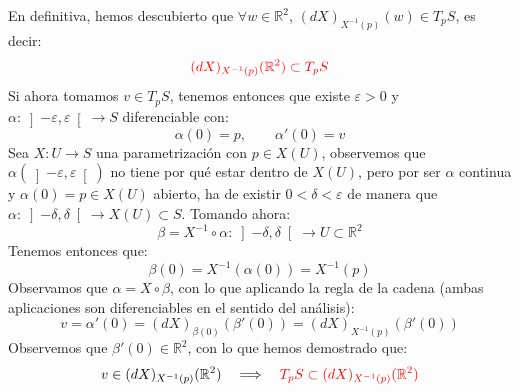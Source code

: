 \noindent
En definitiva, hemos descubierto que $\forall w\in \mathbb{R}^2$, $(dX)_{X^{-1}(p)}(w)\in T_pS$, es decir:
\begin{equation*}
    {\color{red}(dX)_{X^{-1}(p)}(\mathbb{R}^2) \subset T_pS}
\end{equation*}
Si ahora tomamos $v\in T_pS$, tenemos entonces que existe $\varepsilon>0$ y $\alpha:\left]-\varepsilon,\varepsilon\right[\to S$ diferenciable con:
\begin{equation*}
    \alpha(0) = p, \qquad \alpha'(0) = v
\end{equation*}
Sea $X:U\to S$ una parametrización con $p\in X(U)$, observemos que $\alpha\left(\left]-\varepsilon,\varepsilon\right[\right)$ no tiene por qué estar dentro de $X(U)$, pero por ser $\alpha$ continua y $\alpha(0)=p\in X(U)$ abierto, ha de existir $0<\delta< \varepsilon$ de manera que $\alpha:\left]-\delta,\delta\right[\to X(U)\subset S$. Tomando ahora:
\begin{equation*}
    \beta=X^{-1}\circ \alpha:\left]-\delta,\delta\right[ \to U\subset \mathbb{R}^2
\end{equation*}
Tenemos entonces que:
\begin{equation*}
    \beta(0) = X^{-1}(\alpha(0)) = X^{-1}(p)
\end{equation*}
Observamos que $\alpha = X\circ \beta$, con lo que aplicando la regla de la cadena (ambas aplicaciones son diferenciables en el sentido del análisis):
\begin{equation*}
    v = \alpha'(0) = (dX)_{\beta(0)}(\beta'(0)) = (dX)_{X^{-1}(p)}(\beta'(0))
\end{equation*}
Observemos que $\beta'(0)\in \mathbb{R}^2$, con lo que hemos demostrado que:
\begin{equation*}
    v \in (dX)_{X^{-1}(p)}(\mathbb{R}^2) \quad\Longrightarrow\quad {\color{red}T_pS \subset (dX)_{X^{-1}(p)}(\mathbb{R}^2)}
\end{equation*}~\\

